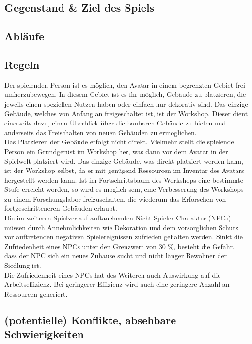 \documentclass[paper=A4,pagesize=auto,12pt,headinclude=true,footinclude=true,BCOR=0mm,DIV=calc]{scrartcl}
\newcommand{\sectionspace}{
	\vspace{0.5cm}
}
\begin{document}
\sectionspace
\subsection{Gegenstand \& Ziel des Spiels}\label{sec:Gegenstand}

\sectionspace
\subsection{Abläufe}\label{sec:Ablaeufe}

\sectionspace
\subsection{Regeln}
Der spielenden Person ist es möglich, den Avatar in einem begrenzten Gebiet frei umherzubewegen. In diesem Gebiet ist es ihr möglich, Gebäude zu platzieren, die jeweils einen speziellen Nutzen haben oder einfach nur dekorativ sind. Das einzige Gebäude, welches von Anfang an freigeschaltet ist, ist der Workshop. Dieser dient einerseits dazu, einen Überblick über die baubaren Gebäude zu bieten und anderseits das Freischalten von neuen Gebäuden zu ermöglichen. \\
Das Platzieren der Gebäude erfolgt nicht direkt. Vielmehr stellt die spielende Person ein Grundgerüst im Workshop her, was dann vor dem Avatar in der Spielwelt platziert wird. Das einzige Gebäude, was direkt platziert werden kann, ist der Workshop selbst, da er mit genügend Ressourcen im Inventar des Avatars hergestellt werden kann.
Ist im Fortschrittsbaum des Workshops eine bestimmte Stufe erreicht worden, so wird es möglich sein, eine Verbesserung des Workshops zu einem Forschungslabor freizuschalten, die wiederum das Erforschen von fortgeschritteneren Gebäuden erlaubt. \\
Die im weiteren Spielverlauf auftauchenden Nicht-Spieler-Charakter (NPCs) müssen durch Annehmlichkeiten wie Dekoration und dem vorsorglichen Schutz vor auftretenden negativen Spielereignissen zufrieden gehalten werden. Sinkt die Zufriedenheit eines NPCs unter den Grenzwert von 30 \%, besteht die Gefahr, dass der NPC sich ein neues Zuhause sucht und nicht länger Bewohner der Siedlung ist. \\ %
Die Zufriedenheit eines NPCs hat des Weiteren auch Auswirkung auf die Arbeitseffizienz. Bei geringerer Effizienz wird auch eine geringere Anzahl an Ressourcen generiert.


\sectionspace
\subsection{(potentielle) Konflikte, absehbare Schwierigkeiten}
\end{document}
